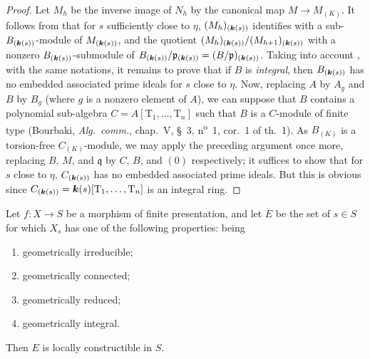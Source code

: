 \begin{proof}
Let $M_h$ be the inverse image of $N_h$ by the canonical map $M\to M_{(K)}$.
It follows from  that for $s$ sufficiently close to $\eta$, $(M_h)_{(\boldsymbol{k}(s))}$ identifies with a sub-$B_{(\boldsymbol{k}(s))}$-module of $M_{(\boldsymbol{k}(s))}$, and the quotient $(M_h)_{(\boldsymbol{k}(s))}/(M_{h+1})_{(\boldsymbol{k}(s))}$ with a nonzero $B_{(\boldsymbol{k}(s))}$-submodule of $B_{(\boldsymbol{k}(s))}/\mathfrak{p}_{(\boldsymbol{k}(s))}=(B/\mathfrak{p})_{(\boldsymbol{k}(s))}$.
Taking into account , with the same notations, it remains to prove that if $B$ is \emph{integral}, then $B_{(\boldsymbol{k}(s))}$ has no embedded associated prime ideals for $s$ close to $\eta$.
Now, replacing $A$ by $A_g$ and $B$ by $B_g$ (where $g$ is a nonzero element of $A$), we can suppose that $B$ contains a polynomial sub-algebra $C=A[\mathrm{T}_1,\ldots,\mathrm{T}_n]$ such that $B$ is a $C$-module of finite type (Bourbaki, \emph{Alg.\ comm.}, chap.\ V, \S~3, n\textsuperscript{o}~1, cor.\ 1 of th.\ 1).
As $B_{(K)}$ is a torsion-free $C_{(K)}$-module, we may apply the preceding argument once more, replacing $B$, $M$, and $\mathfrak{q}$ by $C$, $B$, and $(0)$ respectively; it suffices to show that for $s$ close to $\eta$, $C_{(\boldsymbol{k}(s))}$ has no embedded associated prime ideals.
But this is obvious since $C_{(\boldsymbol{k}(s))}=\boldsymbol{k}(s)[\mathrm{T}_1,\ldots,\mathrm{T}_n]$ is an integral ring.
\end{proof}

\begin{theorem}[9.7.7]
\label{IV.9.7.7}
Let $f:X\to S$ be a morphism of finite presentation, and let $E$ be the set of $s\in S$ for which $X_s$ has one of the following properties: being
\begin{enumerate}[label=\textup{(\roman*)}]
  \item geometrically irreducible;
  \item geometrically connected;
  \item geometrically reduced;
  \item geometrically integral.
\end{enumerate}
Then $E$ is locally constructible in $S$.
\end{theorem}

